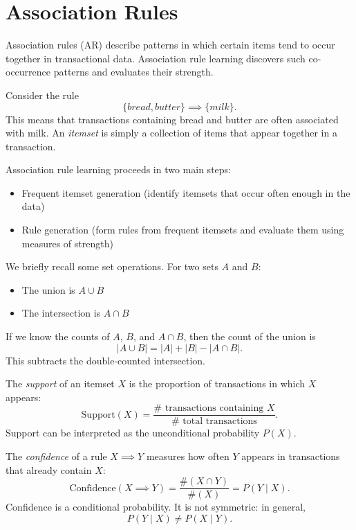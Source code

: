 \section{Association Rules}

\medskip

Association rules (AR) describe patterns in which certain items tend to occur together in transactional data. Association rule learning discovers such co-occurrence patterns and evaluates their strength.

Consider the rule
\[
\{bread, butter\} \implies \{milk\}.
\]
This means that transactions containing bread and butter are often associated with milk. An \emph{itemset} is simply a collection of items that appear together in a transaction.

Association rule learning proceeds in two main steps:
\begin{itemize}
    \item Frequent itemset generation (identify itemsets that occur often enough in the data)
    \item Rule generation (form rules from frequent itemsets and evaluate them using measures of strength)
\end{itemize}

\medskip

We briefly recall some set operations. For two sets $A$ and $B$:
\begin{itemize}
    \item The union is $A \cup B$
    \item The intersection is $A \cap B$
\end{itemize}

If we know the counts of $A$, $B$, and $A \cap B$, then the count of the union is
\[
|A \cup B| = |A| + |B| - |A \cap B|.
\]
This subtracts the double-counted intersection.

\medskip

The \emph{support} of an itemset $X$ is the proportion of transactions in which $X$ appears:
\[
\text{Support}(X) = \frac{\#\text{ transactions containing } X}{\#\text{ total transactions}}.
\]
Support can be interpreted as the unconditional probability $P(X)$.

\medskip

The \emph{confidence} of a rule $X \implies Y$ measures how often $Y$ appears in transactions that already contain $X$:
\[
\text{Confidence}(X \implies Y)
=
\frac{\#(X \cap Y)}{\#(X)}
=
P(Y \mid X).
\]
Confidence is a conditional probability. It is not symmetric: in general,
\[
P(Y \mid X) \neq P(X \mid Y).
\]

